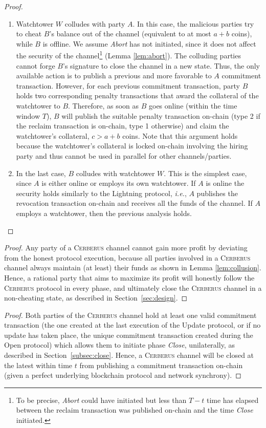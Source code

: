 \documentclass[twocolumn,showpacs,%
  nofootinbib,aps,superscriptaddress,%
  eqsecnum,prd,notitlepage,showkeys,10pt]{revtex4-1}
\newcommand{\ie}{{\em i.e.}}
\newcommand{\sys}{\textsc{Cerberus}\xspace}
\begin{document}
\begin{proof}
\begin{enumerate}[label=(\roman*)]
    \item Watchtower $W$ colludes with party $A$.
    In this case, the malicious parties try to cheat $B$'s balance out of the channel (equivalent to at most $a+b$ coins), while $B$ is offline.
    We assume \textit{Abort} has not initiated, since it does not affect the security of the channel\footnote{To be precise, \textit{Abort} could have initiated but less than $T-t$ time has elapsed between the reclaim transaction was published on-chain and the time \textit{Close} initiated.} (Lemma \ref{lem:abort}).
    The colluding parties cannot forge $B$'s signature to close the channel in a new state. Thus, the only available action is to publish a previous and more favorable to $A$ commitment transaction.
    However, for each previous commitment transaction, party $B$ holds two corresponding penalty transactions that award the collateral of the watchtower to $B$. Therefore, as soon as $B$ goes online (within the time window $T$), $B$ will publish the suitable penalty transaction on-chain (type 2 if the reclaim transaction is on-chain, type 1 otherwise) and claim the watchtower's collateral, $c>a+b$ coins.
    Note that this argument holds because the watchtower's collateral is locked on-chain involving the hiring party and thus cannot be used in parallel for other channels/parties.

    \item In the last case, $B$ colludes with watchtower $W$.
    This is the simplest case, since $A$ is either online or employs its own watchtower. If $A$ is online the security holds similarly to the Lightning protocol, \ie, $A$ publishes the revocation transaction on-chain and receives all the funds of the channel. If $A$ employs a watchtower, then the previous analysis holds.
 \end{enumerate}
\end{proof}


\correctness*
\begin{proof}
Any party of a \sys channel cannot gain more profit by deviating from the honest protocol execution, because all parties involved in a \sys channel always maintain (at least) their funds as shown in Lemma \ref{lem:collusion}. Hence, a rational party that aims to maximize its profit will honestly follow the \sys protocol in every phase, and ultimately close the \sys channel in a non-cheating state, as described in Section~\ref{sec:design}.
\end{proof}

\time*
\begin{proof}
Both parties of the \sys channel hold at least one valid commitment transaction (the one created at the last execution of the Update protocol, or if no update has taken place, the unique commitment transaction created during the Open protocol) which allows them to initiate phase \textit{Close}, unilaterally, as described in Section~\ref{subsec:close}.
Hence, a \sys channel will be closed at the latest within time $t$ from publishing a commitment transaction on-chain (given a perfect underlying blockchain protocol and network synchrony).
\end{proof}
\end{document}
